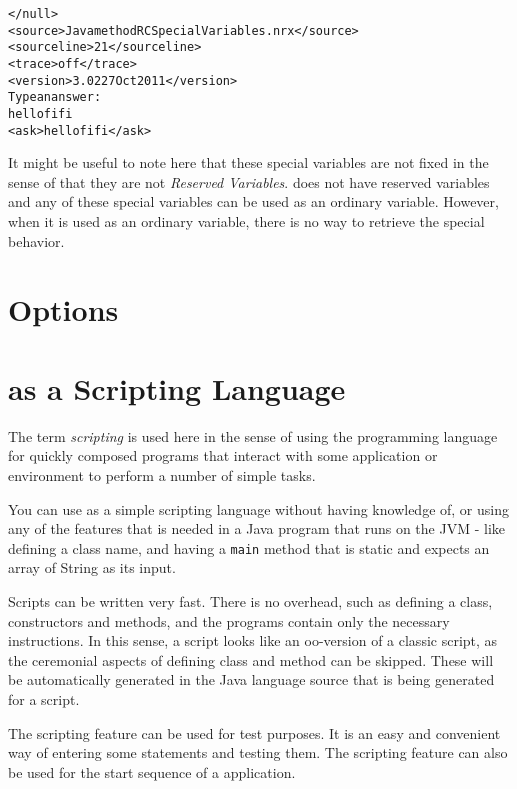 {\begin{alltt}
</null>
<source>Java method RCSpecialVariables.nrx</source>
<sourceline>21</sourceline>
<trace>off</trace>
<version>\nr{} 3.02 27 Oct 2011</version>
Type an answer:
hello fifi
<ask>hello fifi</ask>
\end{alltt}
It might be useful to note here that these special variables are not
fixed in the sense of that they are not \emph{Reserved Variables}. \nr{}
does not have reserved variables and any of these special variables
can be used as an ordinary variable. However, when it is used as an
ordinary variable, there is no way to retrieve the special behavior.

\chapter{\nr{} Options}


\chapter{\nr{} as a Scripting Language}
The term \emph{scripting} is used here in the sense of using the
programming language for quickly composed programs that interact with
some application or environment to perform a number of simple tasks.

You can use \nr{} as a simple scripting language without having
knowledge of, or using any of the features that is needed in a Java
program that runs on the JVM - like defining a class name, and having
a \texttt{main} method that is static and expects an array of String
as its input. 

Scripts can be written very fast. There is
no overhead, such as defining a class, constructors and methods, and the programs contain only
the necessary instructions. In this sense, a \nr{} script looks like
an oo-version of a classic script, as the ceremonial aspects of defining
class and method can be skipped. These will be automatically generated
in the Java language source that is being generated for a script.

The scripting feature can be used for test purposes. It is an easy and convenient way of entering some statements and testing them.
The scripting feature can also be used for the start sequence of a \nr{} application.

}
